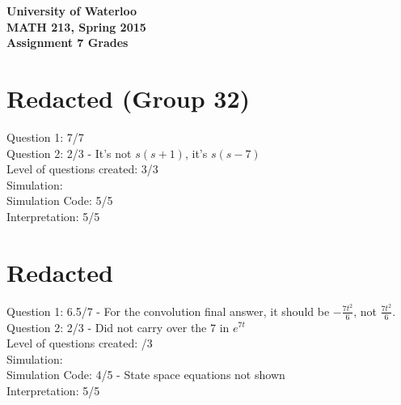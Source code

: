 \documentclass[12pt]{article}
\begin{document}
\begin{center}
{\Large\bf University of Waterloo}\\
\vspace{3mm}
{\Large\bf MATH 213, Spring 2015}\\
\vspace{2mm}
{\Large\bf Assignment 7 Grades}\\
\end{center}

\section*{Redacted (Group 32)}

Question 1: 7/7 \\
Question 2: 2/3 - It's not $s(s + 1)$, it's $s(s - 7)$ \\

\noindent Level of questions created: 3/3 \\

\noindent Simulation: \\
\indent Simulation Code: 5/5 \\
\indent Interpretation: 5/5

\section*{Redacted}

Question 1: 6.5/7 - For the convolution final answer, it should be $-\frac{7t^2}{6}$, not $\frac{7t^2}{6}$. \\
Question 2: 2/3 - Did not carry over the $7$ in $e^{7t}$\\

\noindent Level of questions created: /3 \\

\noindent Simulation: \\
\indent Simulation Code: 4/5 - State space equations not shown \\
\indent Interpretation: 5/5
\end{document}
